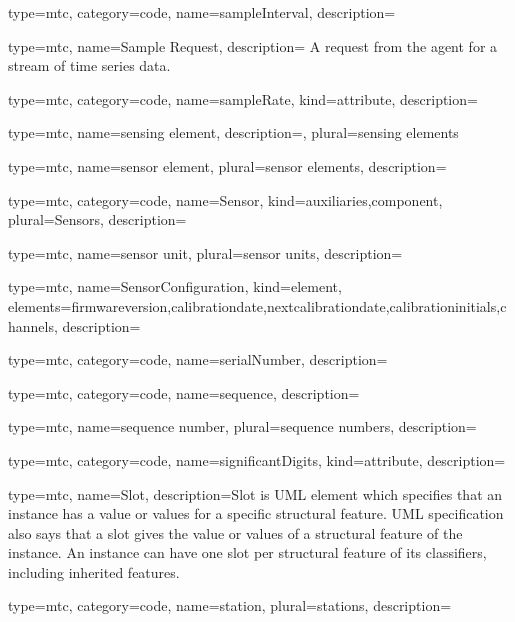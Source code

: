 {
  type=mtc,
  category=code,
  name={sampleInterval},
  description={}
}


{
  type=mtc,
  name={Sample Request},
  description= {A request from the \gls{agent} for a stream of time series data.}
}


{
  type=mtc,
  category=code,
  name={sampleRate},
  kind={attribute},
  description={}
}


{
  type=mtc,
  name={sensing element},
  description={},
  plural={sensing elements}
}


{
  type=mtc,
  name={sensor element},
  plural={sensor elements},
  description={}
}


{
  type=mtc,
  category=code,
  name={Sensor},
  kind={auxiliaries,component},
  plural={Sensors},
  description= {}
}


{
  type=mtc,
  name={sensor unit},
  plural={sensor units},
  description= {}
}


{
  type=mtc,
  name={SensorConfiguration},
  kind={element},
  elements={\gls{firmwareversion},\gls{calibrationdate},\gls{nextcalibrationdate},\gls{calibrationinitials},\glspl{channel}},
  description= {}
}


{
  type=mtc,
  category=code,
  name={serialNumber},
  description={}
}


{
  type=mtc,
  category=code,
  name={sequence},
  description={}
}


{
  type=mtc,
  name={sequence number},
  plural={sequence numbers},
  description={}
}


{
  type=mtc,
  category=code,
  name={significantDigits},
  kind={attribute},
  description={}
}


{
  type=mtc,
  name=Slot,
  description={Slot is UML element which specifies that an instance has a value or values for a specific structural feature. UML specification also says that a slot gives the value or values of a structural feature of the instance. An instance can have one slot per structural feature of its classifiers, including inherited features.}
}


{
  type=mtc,
  category=code,
  name={station},
  plural={stations},
  description={}
}


